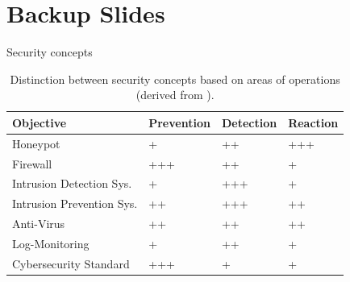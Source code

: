 
\section*{Backup Slides}

\begin{frame}{Security concepts}
    \begin{table}
        \centering
        \caption[Distinction between security concepts]{
            Distinction between security concepts based on areas of operations (derived from \cite{NawrockiWSKS2016}).
        }
        \begin{tabular}{l|lll}
            \toprule
            \textbf{Objective}        & \textbf{Prevention} & \textbf{Detection} & \textbf{Reaction} \\ \hline
            Honeypot                  & +                   & ++                 & +++               \\
            Firewall                  & +++                 & ++                 & +                 \\
            Intrusion Detection Sys.  & +                   & +++                & +                 \\
            Intrusion Prevention Sys. & ++                  & +++                & ++                \\
            Anti-Virus                & ++                  & ++                 & ++                \\
            Log-Monitoring            & +                   & ++                 & +                 \\
            Cybersecurity Standard    & +++                 & +                  & +                 \\
            \bottomrule
        \end{tabular}
        \label{tab:honeypots-security-concepts}
    \end{table}
\end{frame}

